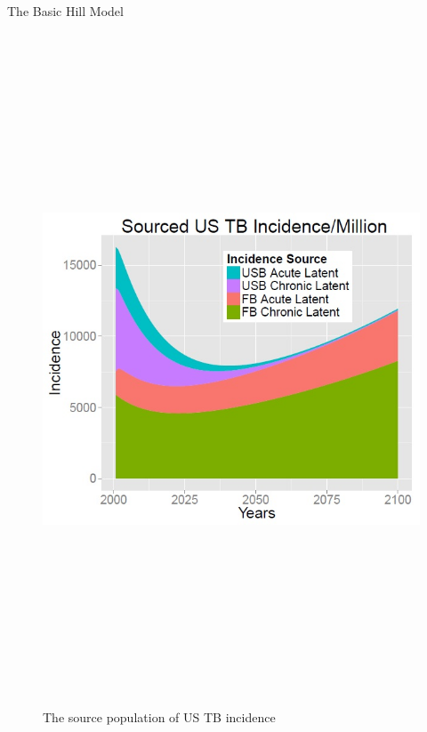 \documentclass[final]{beamer}
\begin{document}
\begin{frame}
\begin{columns}
\begin{column}{.3\textwidth}
\begin{block}{The Basic Hill Model}
\begin{block}{}
\begin{figure}[h]
\begin{center}
              \includegraphics[height=20cm] {newfig}%
            \end{center}
            \caption{The source population of US TB incidence}
            \label{fig:incPlotSourced}
          \end{figure}
          \vspace{-1em}
        \end{block}
      \end{block}
    \end{column}
    

\end{columns}
\end{frame}
\end{document}
